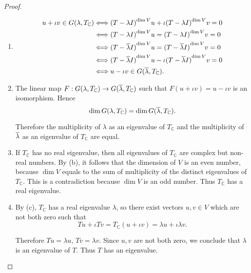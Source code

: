 \begin{proof}
    \begin{enumerate}[label={(\alph*)}]
        \item \begin{align*}
                  u + \iota v\in G(\lambda, T_{\mathbb{C}}) & \Longleftrightarrow {(T - \lambda I)}^{\dim V}u + \iota {(T - \lambda I)}^{\dim V}v = 0               \\
                                                            & \Longleftrightarrow {(T - \lambda I)}^{\dim V}u = {(T - \lambda I)}^{\dim V}v = 0                     \\
                                                            & \Longleftrightarrow {(T - \overline{\lambda} I)}^{\dim V}u = {(T - \overline{\lambda} I)}^{\dim V}v = 0       \\
                                                            & \Longleftrightarrow {(T - \overline{\lambda} I)}^{\dim V}u - \iota {(T - \overline{\lambda} I)}^{\dim V}v = 0 \\
                                                            & \Longleftrightarrow u - \iota v\in G(\overline{\lambda}, T_{\mathbb{C}}).
              \end{align*}
        \item The linear map $F: G(\lambda, T_{\mathbb{C}})\to G(\overline{\lambda}, T_{\mathbb{C}})$ such that $F(u + \iota v) = u - \iota v$ is an isomorphism. Hence
              \[
                  \dim G(\lambda, T_{\mathbb{C}}) = \dim G(\overline{\lambda}, T_{\mathbb{C}}).
              \]

              Therefore the multiplicity of $\lambda$ as an eigenvalue of $T_{\mathbb{C}}$ and the multiplicity of $\overline{\lambda}$ as an eigenvalue of $T_{\mathbb{C}}$ are equal.
        \item If $T_{\mathbb{C}}$ has no real eigenvalue, then all eigenvalues of $T_{\mathbb{C}}$ are complex but non-real numbers. By (b), it follows that the dimension of $V$ is an even number, because $\dim V$ equals to the sum of multiplicity of the distinct eigenvalues of $T_{\mathbb{C}}$. This is a contradiction because $\dim V$ is an odd number. Thus $T_{\mathbb{C}}$ has a real eigenvalue.
        \item By (c), $T_{\mathbb{C}}$ has a real eigenvalue $\lambda$, so there exist vectors $u, v\in V$ which are not both zero such that
              \[
                  Tu + \iota Tv = T_{\mathbb{C}}(u + \iota v) = \lambda u + \iota \lambda v.
              \]

              Therefore $Tu = \lambda u$, $Tv = \lambda v$. Since $u, v$ are not both zero, we conclude that $\lambda$ is an eigenvalue of $T$. Thus $T$ has an eigenvalue.
    \end{enumerate}
\end{proof}
\newpage

